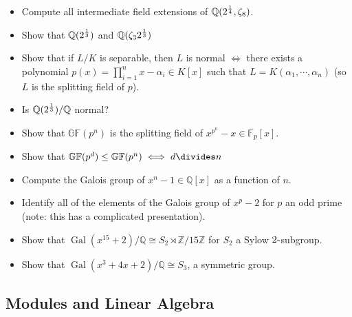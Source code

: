 \begin{itemize}
\tightlist
\item
  Compute all intermediate field extensions of
  \({\mathbb{Q}}(2^{1\over 4}, \zeta_8)\).
\item
  Show that \({\mathbb{Q}}(2^{1\over 3})\) and
  \({\mathbb{Q}}(\zeta_3 2^{1\over 3})\)
\item
  Show that if \(L/K\) is separable, then \(L\) is normal \(\iff\) there
  exists a polynomial \(p(x) = \prod_{i=1}^n x- \alpha_i\in K[x]\) such
  that \(L = K(\alpha_1, \cdots, \alpha_n)\) (so \(L\) is the splitting
  field of \(p\)).
\item
  Is \({\mathbb{Q}}(2^{1\over 3})/{\mathbb{Q}}\) normal?
\item
  Show that \({\mathbb{GF}}(p^n)\) is the splitting field of
  \(x^{p^n} - x \in {\mathbb{F}}_p[x]\).
\item
  Show that
  \({\mathbb{GF}}(p^d) \leq {\mathbb{GF}}(p^n) \iff d\divides n\)
\item
  Compute the Galois group of \(x^n - 1 \in {\mathbb{Q}}[x]\) as a
  function of \(n\).
\item
  Identify all of the elements of the Galois group of \(x^p-2\) for
  \(p\) an odd prime (note: this has a complicated presentation).
\item
  Show that
  \({ \operatorname{Gal}} (x^{15}+2)/{\mathbb{Q}}\cong S_2 \rtimes{\mathbb{Z}}/15{\mathbb{Z}}\)
  for \(S_2\) a Sylow \(2{\hbox{-}}\)subgroup.
\item
  Show that \({ \operatorname{Gal}} (x^3+4x+2)/{\mathbb{Q}}\cong S_3\),
  a symmetric group.
\end{itemize}

\hypertarget{modules-and-linear-algebra}{%
\subsection{Modules and Linear
Algebra}\label{modules-and-linear-algebra}}

